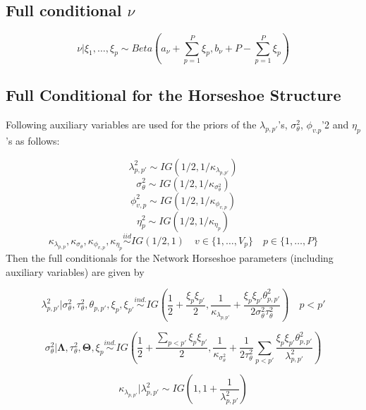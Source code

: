 \documentclass[
]{article}
\begin{document}
\subsection{\texorpdfstring{Full conditional \(\nu\)}{Full conditional \textbackslash nu}}\label{full-conditional-nu}

\[ \nu|\xi_1,\ldots,\xi_p \sim Beta \left(a_\nu + \sum_{p=1}^P \xi_p, b_{\nu}+P-\sum_{p=1}^P \xi_p \right) \]

\subsection{Full Conditional for the Horseshoe Structure}\label{full-conditional-for-the-horseshoe-structure}

Following \citep{makalic_simple_2016} auxiliary variables are used for the priors of
the \(\lambda_{p,p'}\)'s, \(\sigma^2_\theta\), \(\phi_{v.p}\)'2 and \(\eta_p\)'s as
follows:

\[ \lambda^2_{p,p'} \sim IG(1/2, 1/\kappa_{\lambda_{p,p'}}) \]
\[ \sigma^2_\theta \sim IG(1/2, 1/\kappa_{\sigma^2_\theta}) \]
\[ \phi^2_{v,p} \sim IG(1/2, 1/\kappa_{\phi_{v,p}}) \]
\[ \eta^2_p \sim IG(1/2, 1/\kappa_{\eta_p}) \]
\[ \kappa_{\lambda_{p,p}}, \kappa_{\sigma_\theta}, \kappa_{\phi_{v,p}}, \kappa_{\eta_p} \stackrel{iid}{\sim} IG(1/2, 1) \quad v \in \{1,\ldots,V_p\} \quad p \in \{1,\ldots,P\} \]
Then the full conditionals for the Network Horseshoe parameters (including auxiliary variables) are given by

\begin{equation}
\lambda^2_{p,p'}| \sigma^2_\theta, \tau^2_\theta, \theta_{p,p'}, \xi_p, \xi_{p'} \stackrel{ind.}{\sim}
IG \left(\frac{1}{2} + \frac{\xi_p\xi_{p'}}{2}, \frac{1}{\kappa_{\lambda_{p,p'}}}+\frac{\xi_p\xi_{p'}\theta^2_{p,p'}}{2 \sigma^2_\theta \tau^2_\theta}\right) \quad p<p'
\label{eq:horseshoeLambda}
\end{equation}

\begin{equation}
\sigma^2_\theta|  {\boldsymbol \Lambda} , \tau^2_\theta,  {\boldsymbol \Theta} , \xi_p \stackrel{ind.}{\sim} IG \left(\frac{1}{2} + \frac{\sum_{p<p'}\xi_p\xi_{p'}}{2}, \frac{1}{\kappa_{\sigma^2_\theta}} + \frac{1}{2 \tau^2_\theta} \sum_{p<p'}\frac{\xi_p\xi_{p'}\theta_{p,p'}^2}{\lambda^2_{p,p'}} \right)
\label{eq:horseshoeSigma}
\end{equation}

\begin{equation}
\kappa_{\lambda_{p,p'}}|\lambda^2_{p,p'} \sim IG \left(1, 1 + \frac{1}{\lambda^2_{p,p'}}\right)
\label{eq:horseshoeKappaLambda}
\end{equation}
\end{document}
